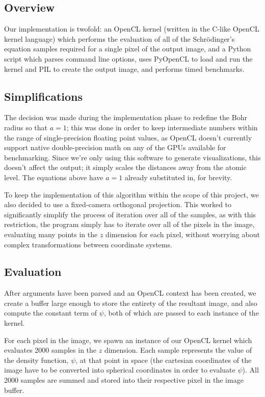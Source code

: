 \documentclass{acmsiggraph}
\begin{document}
\subsection{Overview}

Our implementation is twofold: an OpenCL kernel (written in the C-like OpenCL kernel language) which performs the evaluation of all of the Schr\"{o}dinger's equation samples required for a single pixel of the output image, and a Python script which parses command line options, uses PyOpenCL to load and run the kernel and PIL to create the output image, and performs timed benchmarks.

\subsection{Simplifications}

\label{simpSection}

The decision was made during the implementation phase to redefine the Bohr radius so that $a=1$; this was done in order to keep intermediate numbers within the range of single-precision floating point values, as OpenCL doesn't currently support native double-precision math on any of the GPUs available for benchmarking. Since we're only using this software to generate visualizations, this doesn't affect the output; it simply scales the distances away from the atomic level. The equations above have $a=1$ already substituted in, for brevity.

To keep the implementation of this algorithm within the scope of this project, we also decided to use a fixed-camera orthogonal projection. This worked to significantly simplify the process of iteration over all of the samples, as with this restriction, the program simply has to iterate over all of the pixels in the image, evaluating many points in the $z$ dimension for each pixel, without worrying about complex transformations between coordinate systems.

\subsection{Evaluation}

After arguments have been parsed and an OpenCL context has been created, we create a buffer large enough to store the entirety of the resultant image, and also compute the constant term of $\psi$, both of which are passed to each instance of the kernel.

For each pixel in the image, we spawn an instance of our OpenCL kernel which evaluates 2000 samples in the $z$ dimension. Each sample represents the value of the density function, $\psi$, at that point in space (the cartesian coordinates of the image have to be converted into spherical coordinates in order to evaluate $\psi$). All 2000 samples are summed and stored into their respective pixel in the image buffer.
\end{document}
